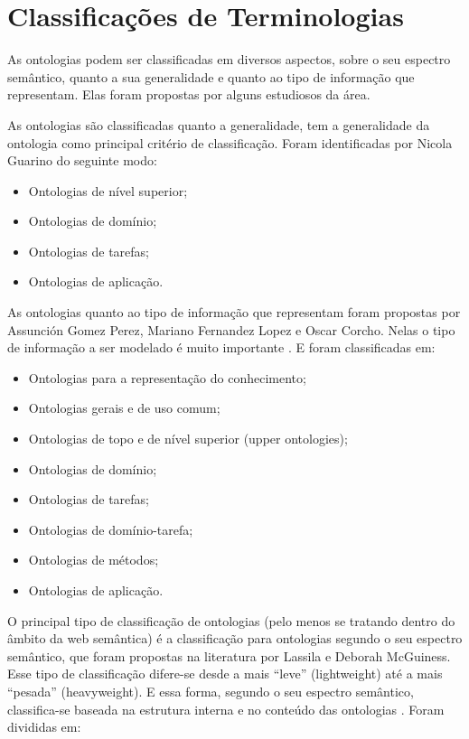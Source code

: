 \section{Classificações de Terminologias}

As ontologias podem ser classificadas em diversos aspectos, sobre o seu espectro
semântico, quanto a sua generalidade e quanto ao tipo de informação que representam.
Elas foram propostas por alguns estudiosos da área.

As ontologias são classificadas quanto a generalidade, tem a generalidade da ontologia
como principal critério de classificação. Foram identificadas por Nicola Guarino do
seguinte modo:
\begin{itemize}
  \item Ontologias de nível superior;
  \item Ontologias de domínio;
  \item Ontologias de tarefas;
  \item Ontologias de aplicação.
\end{itemize}
As ontologias quanto ao tipo de informação que representam foram propostas por
Assunción Gomez Perez, Mariano Fernandez Lopez e Oscar Corcho. Nelas o tipo de
informação a ser modelado é muito importante \cite{breitman05}. E foram classificadas em:

\begin{itemize}
\item Ontologias para a representação do conhecimento;
\item Ontologias gerais e de uso comum;
\item Ontologias de topo e de nível superior (upper ontologies);
\item Ontologias de domínio;
\item Ontologias de tarefas;
\item Ontologias de domínio-tarefa;
\item Ontologias de métodos;
\item Ontologias de aplicação.
\end{itemize}

O principal tipo de classificação de ontologias (pelo menos se tratando dentro do
âmbito da web semântica) é a classificação para ontologias segundo o seu espectro
semântico, que foram propostas na literatura por Lassila e Deborah McGuiness. Esse tipo
de classificação difere-se desde a mais “leve” (lightweight) até a mais “pesada”
(heavyweight). E essa forma, segundo o seu espectro semântico, classifica-se baseada na
estrutura interna e no conteúdo das ontologias \cite{breitman05} . Foram divididas em:

